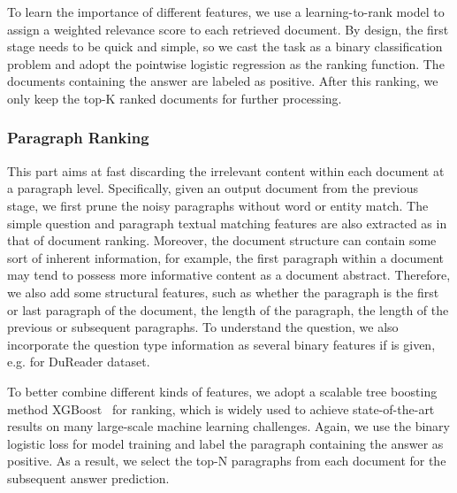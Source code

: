 \documentclass[letterpaper]{article} \usepackage{aaai19}  \usepackage{graphicx}
\begin{document}
To learn the importance of different features, we use a learning-to-rank model to assign a weighted relevance score to each retrieved document. By design, the first stage needs to be quick and simple, so we cast the task as a binary classification problem and adopt the pointwise logistic regression as the ranking function. The documents containing the answer are labeled as positive. After this ranking, we only keep the top-K ranked documents for further processing. 

\subsubsection{Paragraph Ranking}
This part aims at fast discarding the irrelevant content within each document at a paragraph level. Specifically, given an output document  from the previous stage, we first prune the noisy paragraphs without word or entity match. The simple question and paragraph textual matching features are also extracted as in that of document ranking. Moreover, the document structure can contain some sort of inherent information, for example, the first paragraph within a document may tend to possess more informative content as a document abstract. Therefore, we also add some structural features, such as whether the paragraph is the first or last paragraph of the document, the length of the paragraph, the length of the previous or subsequent paragraphs. To understand the question, we also incorporate the question type information as several binary features if is given, e.g. for DuReader dataset. 

To better combine different kinds of features, we adopt a scalable tree boosting method XGBoost~\cite{chen2016xgboost} for ranking, which is widely used to achieve state-of-the-art results on many large-scale machine learning challenges. Again, we use the binary logistic loss for model training and label the paragraph containing the answer as positive. As a result, we select the top-N paragraphs from each document for the subsequent answer prediction. 
\end{document}
